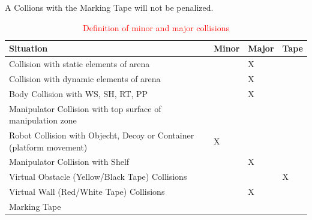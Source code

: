 A Collions with the Marking Tape will not be penalized.


\begin{table}[h!]
	\caption{\textcolor{red}{Definition of minor and major collisions}}
	\label{tab:collisions}
	\centering
	\begin{tabular}{|p{10cm}|p{1cm}|p{1cm}|p{1.5cm}|}
		\hline
		Situation                                                & Minor & Major &  Tape \\
		\hline
		Collision with static elements of arena                  &       & X     &              \\
		Collision with dynamic elements of arena                 &       & X     &              \\
		Body Collision with WS, SH, RT, PP                     &       & X     &              \\
		Manipulator Collision with top surface of manipulation zone       &       &       &              \\
		Robot Collision with Objecht, Decoy or Container (platform movement)    &  X     &       &              \\

		Manipulator Collision with Shelf                   &      & X      &              \\
		Virtual Obstacle (Yellow/Black Tape) Collisions          &       &       & X            \\
		Virtual Wall (Red/White Tape) Collisions                 &       & X     &              \\
		Marking Tape & & & \\
		\hline
	\end{tabular}
\end{table}



